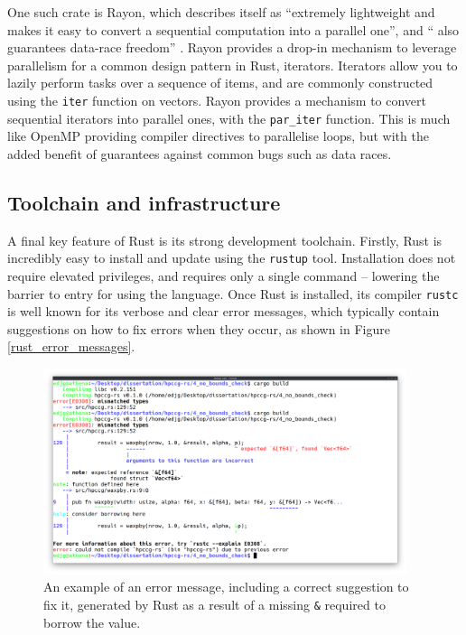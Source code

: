 One such crate is Rayon, which describes itself as ``extremely lightweight and makes it easy to convert a sequential computation into a parallel one'', and `` also guarantees data-race freedom''  \cite{RayonRust}. Rayon provides a drop-in mechanism to leverage parallelism for a common design pattern in Rust, iterators. Iterators allow you to lazily perform tasks over a sequence of items, and are commonly constructed using the \texttt{iter} function on vectors. Rayon provides a mechanism to convert sequential iterators into parallel ones, with the \texttt{par\_iter} function. This is much like OpenMP providing compiler directives to parallelise loops, but with the added benefit of guarantees against common bugs such as data races.


\subsection{Toolchain and infrastructure}
\label{ssec:rust-toolchain}

A final key feature of Rust is its strong development toolchain. Firstly, Rust is incredibly easy to install and update using the \texttt{rustup} tool. Installation does not require elevated privileges, and requires only a single command -- lowering the barrier to entry for using the language. Once Rust is installed, its compiler \texttt{rustc} is well known for its verbose and clear error messages, which typically contain suggestions on how to fix errors when they occur, as shown in Figure \ref{rust_error_messages}.

\begin{figure}[H]
    \centering
    \includegraphics[width=0.95\textwidth]{images/2_background/rust_error_messages.png}
    \caption{An example of an error message, including a correct suggestion to fix it, generated by Rust as a result of a missing \texttt{&} required to borrow the value.}
    \label{fig:rust_error_messages}
\end{figure}

